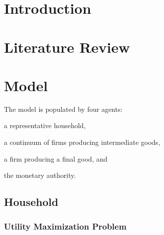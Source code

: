 \documentclass[
	12pt,
	]{article}
\numberwithin{equation}{section}
\theoremstyle{definition}
\theoremstyle{plain}
\theoremstyle{plain}
\theoremstyle{plain}
\begin{document}
\section{Introduction}\label{sec:introduction}

\lipsum[1]



\section{Literature Review}\label{sec:literature-review}

\lipsum[1]

\newpage


\section{Model}\label{sec:model}


The model is populated by four agents: 
\begin{enumerate*}[label=(\arabic*)]
	\item a representative household,
	\item a continuum of firms producing intermediate goods,
	\item a firm producing a final good, and
	\item the monetary authority.
\end{enumerate*}


\subsection{Household}

\subsubsection*{Utility Maximization Problem}
\end{document}
